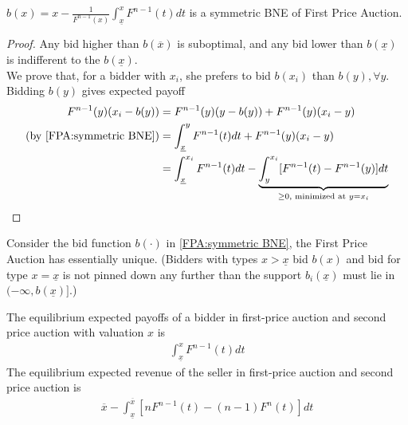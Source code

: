 \documentclass[11pt]{elegantbook}
\begin{document}
\begin{proposition}
    $b(x)=x-\frac{1}{F^{n-1}(x)}\int_{\underline{x}}^x F^{n-1}(t) dt$ is a symmetric BNE of First Price Auction.
\end{proposition}
\begin{proof}
    Any bid higher than $b(\overline{x})$ is suboptimal, and any bid lower than $b(\underline{x})$ is indifferent to the $b(\underline{x})$.\\
    We prove that, for a bidder with $x_i$, she prefers to bid $b(x_i)$ than $b(y),\forall y$.\\
    Bidding $b(y)$ gives expected payoff
    \begin{equation}
        \begin{aligned}
            F^{n-1}(y)(x_i-b(y))&=F^{n-1}(y)(y-b(y))+F^{n-1}(y)(x_i-y)\\
            (\textnormal{by \eqref{FPA:symmetric BNE}})&=\int_{\underline{x}}^y F^{n-1}(t) dt+F^{n-1}(y)(x_i-y)\\
            &=\int_{\underline{x}}^{x_i} F^{n-1}(t) dt-\underbrace{\int_y^{x_i} [F^{n-1}(t)-F^{n-1}(y)] dt}_{\geq 0, \textnormal{ minimized at }y=x_i}
        \end{aligned}
        \nonumber
    \end{equation}
\end{proof}

\begin{theorem}[Lebrun, 1999]
    Consider the bid function $b(\cdot)$ in \eqref{FPA:symmetric BNE}, the First Price Auction has essentially unique. (Bidders with types $x>\underline{x}$ bid $b(x)$ and bid for type $x=\underline{x}$ is not pinned down any further than the support $b_i(\underline{x})$ must lie in $(-\infty,b(\underline{x})]$.)
\end{theorem}

The equilibrium expected payoffs of a bidder in first-price auction and second price auction with valuation $x$ is
\begin{equation}
    \begin{aligned}
        \int_{\underline{x}}^x F^{n-1}(t)dt
    \end{aligned}
    \nonumber
\end{equation}
The equilibrium expected revenue of the seller in first-price auction and second price auction is
\begin{equation}
    \begin{aligned}
        \overline{x}-\int_{\underline{x}}^{\overline{x}} [nF^{n-1}(t)-(n-1)F^n(t)]dt
    \end{aligned}
    \nonumber
\end{equation}
\end{document}

